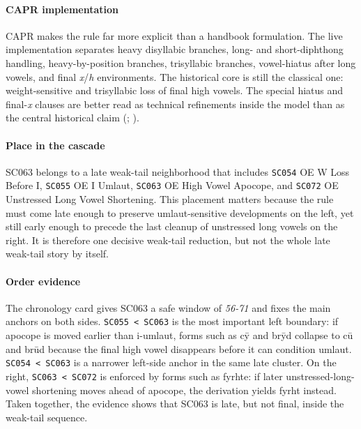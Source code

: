 \documentclass[
  british,
  a4paper,
]{article}
\begin{document}
\paragraph{CAPR implementation}\label{capr-implementation-40}

CAPR makes the rule far more explicit than a handbook formulation. The
live implementation separates heavy disyllabic branches, long- and
short-diphthong handling, heavy-by-position branches, trisyllabic
branches, vowel-hiatus after long vowels, and final \emph{x}/\emph{h}
environments. The historical core is still the classical one:
weight-sensitive and trisyllabic loss of final high vowels. The special
hiatus and final-\emph{x} clauses are better read as technical
refinements inside the model than as the central historical claim
(;
).

\paragraph{Place in the cascade}\label{place-in-the-cascade-40}

SC063 belongs to a late weak-tail neighborhood that includes
\texttt{SC054} OE W Loss Before I, \texttt{SC055} OE I Umlaut,
\texttt{SC063} OE High Vowel Apocope, and \texttt{SC072} OE Unstressed
Long Vowel Shortening. This placement matters because the rule must come
late enough to preserve umlaut-sensitive developments on the left, yet
still early enough to precede the last cleanup of unstressed long vowels
on the right. It is therefore one decisive weak-tail reduction, but not
the whole late weak-tail story by itself.

\paragraph{Order evidence}\label{order-evidence-40}

The chronology card gives SC063 a safe window of \emph{56-71} and fixes
the main anchors on both sides. \texttt{SC055\ \textless{}\ SC063} is
the most important left boundary: if apocope is moved earlier than
i-umlaut, forms such as cȳ and brȳd collapse to cū and brūd because the
final high vowel disappears before it can condition umlaut.
\texttt{SC054\ \textless{}\ SC063} is a narrower left-side anchor in the
same late cluster. On the right, \texttt{SC063\ \textless{}\ SC072} is
enforced by forms such as fyrhte: if later unstressed-long-vowel
shortening moves ahead of apocope, the derivation yields fyrht instead.
Taken together, the evidence shows that SC063 is late, but not final,
inside the weak-tail sequence.
\end{document}
